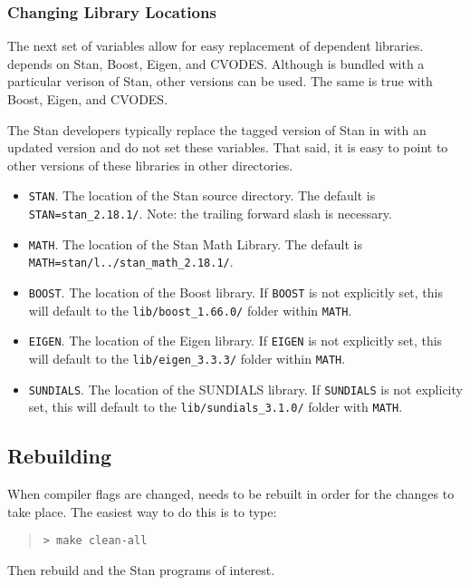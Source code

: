 \subsubsection{Changing Library Locations}

The next set of variables allow for easy replacement of dependent
libraries. \CmdStan depends on Stan, Boost, Eigen, and
CVODES. Although \CmdStan is bundled with a particular verison of
Stan, other versions can be used. The same is true with Boost, Eigen,
and CVODES.

The Stan developers typically replace the tagged version of Stan in
 with an updated version and do not set
these variables. That said, it is easy to point \CmdStan to other
versions of these libraries in other directories.
%
\begin{itemize}
  \item \Verb|STAN|. The location of the Stan source
    directory. The default is \Verb|STAN=stan_2.18.1/|. Note: the
    trailing forward slash is necessary.
  \item \Verb|MATH|. The location of the Stan Math Library. The
    default is \Verb|MATH=stan/l../stan_math_2.18.1/|.
  \item \Verb|BOOST|. The location of the Boost library. If
    \Verb|BOOST| is not explicitly set, this will default to the
    \Verb|lib/boost_1.66.0/| folder within \Verb|MATH|.
  \item \Verb|EIGEN|. The location of the Eigen library. If
    \Verb|EIGEN| is not explicitly set, this will default to the
    \Verb|lib/eigen_3.3.3/| folder within \Verb|MATH|.
  \item \Verb|SUNDIALS|. The location of the SUNDIALS library. If
    \Verb|SUNDIALS| is not explicity set, this will default to the
    \Verb|lib/sundials_3.1.0/| folder with \Verb|MATH|.
\end{itemize}
%


\subsection{Rebuilding \CmdStan}

When compiler flags are changed, \CmdStan needs to be rebuilt in order
for the changes to take place. The easiest way to do this is to type:
%
\begin{quote}
  \begin{Verbatim}[fontshape=sl]
> make clean-all
  \end{Verbatim}
\end{quote}
%
Then rebuild \CmdStan and the Stan programs of interest.


